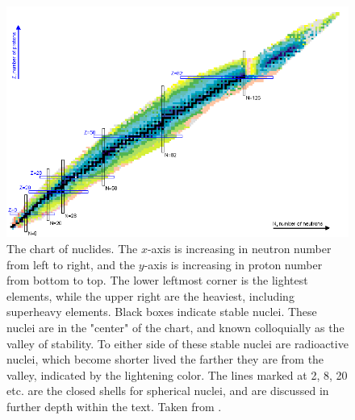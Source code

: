 \begin{figure}
    \centering
    \includegraphics[scale=0.5]{Introduction_Figs/chartofnuclides_nndc.png}
    \caption{The chart of nuclides. The $x$-axis is increasing in neutron number from left to right, and the $y$-axis is increasing in proton number from bottom to top. The lower leftmost corner is the lightest elements, while the upper right are the heaviest, including superheavy elements. Black boxes indicate stable nuclei. These nuclei are in the "center" of the chart, and known colloquially as the valley of stability. To either side of these stable nuclei are radioactive nuclei, which become shorter lived the farther they are from the valley, indicated by the lightening color. The lines marked at 2, 8, 20 etc. are the closed shells for spherical nuclei, and are discussed in further depth within the text. Taken from \citep{nndc:_chart}.}
    \label{fig:chart}
\end{figure}